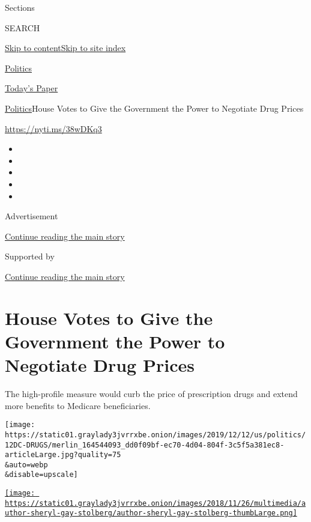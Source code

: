 Sections

SEARCH

\protect\hyperlink{site-content}{Skip to
content}\protect\hyperlink{site-index}{Skip to site index}

\href{https://www.nytimes3xbfgragh.onion/section/politics}{Politics}

\href{https://myaccount.nytimes3xbfgragh.onion/auth/login?response_type=cookie\&client_id=vi}{}

\href{https://www.nytimes3xbfgragh.onion/section/todayspaper}{Today's
Paper}

\href{/section/politics}{Politics}\textbar{}House Votes to Give the
Government the Power to Negotiate Drug Prices

\url{https://nyti.ms/38wDKq3}

\begin{itemize}
\item
\item
\item
\item
\item
\end{itemize}

Advertisement

\protect\hyperlink{after-top}{Continue reading the main story}

Supported by

\protect\hyperlink{after-sponsor}{Continue reading the main story}

\hypertarget{house-votes-to-give-the-government-the-power-to-negotiate-drug-prices}{%
\section{House Votes to Give the Government the Power to Negotiate Drug
Prices}\label{house-votes-to-give-the-government-the-power-to-negotiate-drug-prices}}

The high-profile measure would curb the price of prescription drugs and
extend more benefits to Medicare beneficiaries.

\texttt{[image: https://static01.graylady3jvrrxbe.onion/images/2019/12/12/us/politics/12DC-DRUGS/merlin\_164544093\_dd0f09bf-ec70-4d04-804f-3c5f5a381ec8-articleLarge.jpg?quality=75\\\&auto=webp\\\&disable=upscale]}

\href{https://www.nytimes3xbfgragh.onion/by/sheryl-gay-stolberg}{\texttt{[image: https://static01.graylady3jvrrxbe.onion/images/2018/11/26/multimedia/author-sheryl-gay-stolberg/author-sheryl-gay-stolberg-thumbLarge.png]}}

